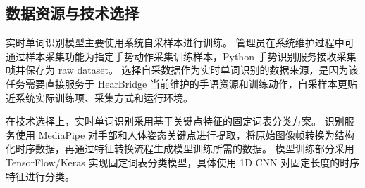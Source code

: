 
\subsection{数据资源与技术选择}

实时单词识别模型主要使用系统自采样本进行训练。
管理员在系统维护过程中可通过样本采集功能为指定手势动作采集训练样本，Python 手势识别服务接收采集帧并保存为 raw dataset。
选择自采数据作为实时单词识别的数据来源，是因为该任务需要直接服务于 HearBridge 当前维护的手语资源和训练动作，自采样本更贴近系统实际训练项、采集方式和运行环境。

在技术选择上，实时单词识别采用基于关键点特征的固定词表分类方案。
识别服务使用 MediaPipe 对手部和人体姿态关键点进行提取，将原始图像帧转换为结构化时序数据，再通过特征转换流程生成模型训练所需的数据。
模型训练部分采用 TensorFlow/Keras 实现固定词表分类模型，具体使用 1D CNN 对固定长度的时序特征进行分类。
